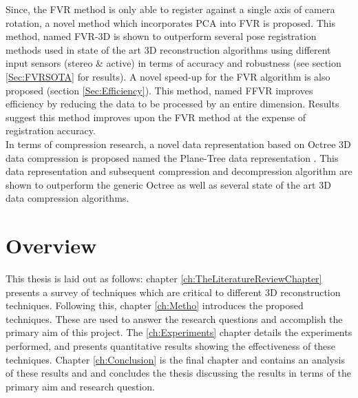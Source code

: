 Since, the FVR method is only able to register against a single axis of camera rotation, a novel method which incorporates PCA into FVR is proposed. This method, named FVR-3D is shown to outperform several pose registration methods used in state of the art 3D reconstruction algorithms using different input sensors (stereo \& active) in terms of accuracy and robustness (see section \ref{Sec:FVRSOTA} for results). A novel speed-up for the FVR algorithm is also proposed (section \ref{Sec:Efficiency}). This method, named FFVR improves efficiency by reducing the data to be processed by an entire dimension. Results suggest this method improves upon the FVR method at the expense of registration accuracy. \\

In terms of compression research, a novel data representation based on Octree 3D data compression is proposed named the Plane-Tree data representation \cite{Lincoln15Plane}. This data representation and subsequent compression and decompression algorithm are shown to outperform the generic Octree as well as several state of the art 3D data compression algorithms. \\


\section{Overview}

This thesis is laid out as follows: chapter \ref{ch:TheLiteratureReviewChapter} presents a survey of techniques which are critical to different 3D reconstruction techniques. Following this, chapter \ref{ch:Metho} introduces the proposed techniques. These are used to answer the research questions and accomplish the primary aim of this project. The \ref{ch:Experiments} chapter details the experiments performed, and presents quantitative results showing the effectiveness of these techniques. Chapter \ref{ch:Conclusion} is the final chapter and contains an analysis of these results and and concludes the thesis discussing the results in terms of the primary aim and research question. 


